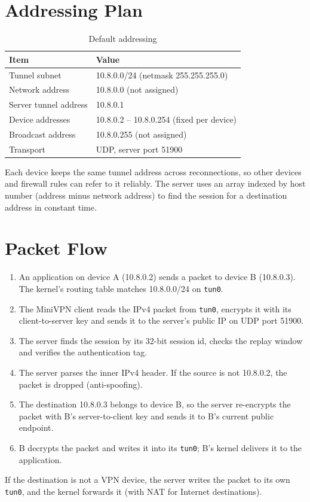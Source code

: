 \documentclass[12pt,a4paper]{report}
\begin{document}
\section{Addressing Plan}
\begin{table}[H]
\centering
\caption{Default addressing}
\begin{tabular}{@{}ll@{}}
\toprule
\textbf{Item} & \textbf{Value}\\
\midrule
Tunnel subnet & 10.8.0.0/24 (netmask 255.255.255.0)\\
Network address & 10.8.0.0 (not assigned)\\
Server tunnel address & 10.8.0.1\\
Device addresses & 10.8.0.2 -- 10.8.0.254 (fixed per device)\\
Broadcast address & 10.8.0.255 (not assigned)\\
Transport & UDP, server port 51900\\
\bottomrule
\end{tabular}
\end{table}
Each device keeps the same tunnel address across reconnections, so other devices and
firewall rules can refer to it reliably. The server uses an array indexed by host
number (address minus network address) to find the session for a destination address
in constant time.

\section{Packet Flow}
\begin{enumerate}
  \item An application on device A (10.8.0.2) sends a packet to device B (10.8.0.3).
        The kernel's routing table matches 10.8.0.0/24 on \texttt{tun0}.
  \item The MiniVPN client reads the IPv4 packet from \texttt{tun0}, encrypts it with its
        client-to-server key and sends it to the server's public IP on UDP port 51900.
  \item The server finds the session by its 32-bit session id, checks the replay window and
        verifies the authentication tag.
  \item The server parses the inner IPv4 header. If the source is not 10.8.0.2, the packet
        is dropped (anti-spoofing).
  \item The destination 10.8.0.3 belongs to device B, so the server re-encrypts the packet
        with B's server-to-client key and sends it to B's current public endpoint.
  \item B decrypts the packet and writes it into its \texttt{tun0}; B's kernel delivers it
        to the application.
\end{enumerate}
If the destination is not a VPN device, the server writes the packet to its own
\texttt{tun0}, and the kernel forwards it (with NAT for Internet destinations).
\end{document}
